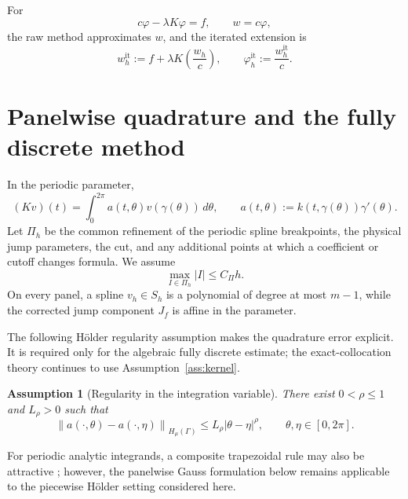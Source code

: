 \documentclass[11pt,a4paper]{amsart}
\theoremstyle{plain}
\newtheorem{assumption}[theorem]{Assumption}
\theoremstyle{definition}
\theoremstyle{remark}
\newcommand{\Ga}{\Gamma}
\newcommand{\norm}[1]{\left\|#1\right\|}
\begin{document}
For
\[
        c\varphi-\lambda K\varphi=f,
        \qquad w=c\varphi,
\]
the raw method approximates $w$, and the iterated extension is
\begin{equation}\label{eq:bsh-iterated-variable}
        w_h^{\mathrm{it}}
        :=f+\lambda K\!\left(\frac{w_h}{c}\right),
        \qquad
        \varphi_h^{\mathrm{it}}
        :=\frac{w_h^{\mathrm{it}}}{c}.
\end{equation}


\section{Panelwise quadrature and the fully discrete method}\label{sec:quadrature}

In the periodic parameter,
\begin{equation}\label{eq:paramintegral}
        (Kv)(t)
        =
        \int_0^{2\pi}
        a(t,\theta)v(\gamma(\theta))\,d\theta,
        \qquad
        a(t,\theta):=
        k(t,\gamma(\theta))\gamma'(\theta).
\end{equation}
Let $\Pi_h$ be the common refinement of the periodic spline breakpoints, the
physical jump parameters, the cut, and any additional points at which a
coefficient or cutoff changes formula.  We assume
\begin{equation}\label{eq:panel-size}
        \max_{I\in\Pi_h}|I|\le C_\Pi h.
\end{equation}
On every panel, a spline $v_h\in S_h$ is a polynomial of degree at most
$m-1$, while the corrected jump component $J_f$ is affine in the parameter.

The following H\"older regularity assumption makes the quadrature error explicit.  It is required only for the algebraic fully discrete estimate;
the exact-collocation theory continues to use Assumption~\ref{ass:kernel}.

\begin{assumption}[Regularity in the integration variable]
\label{ass:quadrature-power}
There exist $0<\rho\le1$ and $L_\rho>0$ such that
\begin{equation}\label{eq:a-rho}
        \norm{a(\cdot,\theta)-a(\cdot,\eta)}_{H_\mu(\Ga)}
        \le
        L_\rho|\theta-\eta|^\rho,
        \qquad
        \theta,\eta\in[0,2\pi].
\end{equation}
\end{assumption}

For periodic analytic integrands, a composite trapezoidal rule may also be
attractive \cite{TrefethenWeideman}; however, the panelwise Gauss formulation
below remains applicable to the piecewise H\"older setting considered here.
\end{document}

